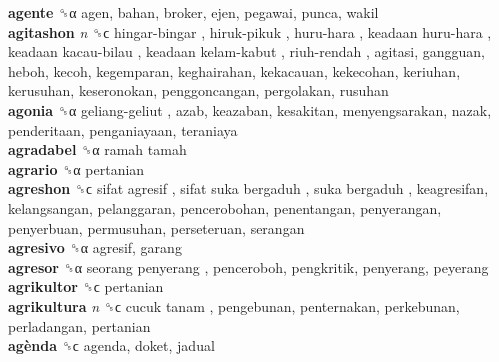 \textbf{agente} ␝α  agen, bahan, broker, ejen, pegawai, punca, wakil  \\
\textbf{agitashon} \emph{n}  ␝ϲ   hingar-bingar ,  hiruk-pikuk ,  huru-hara ,  keadaan huru-hara ,  keadaan kacau-bilau ,  keadaan kelam-kabut ,  riuh-rendah , agitasi, gangguan, heboh, kecoh, kegemparan, keghairahan, kekacauan, kekecohan, keriuhan, kerusuhan, keseronokan, penggoncangan, pergolakan, rusuhan  \\
\textbf{agonia} ␝α   geliang-geliut , azab, keazaban, kesakitan, menyengsarakan, nazak, penderitaan, penganiayaan, teraniaya  \\
\textbf{agradabel} ␝α   ramah tamah   \\
\textbf{agrario} ␝α  pertanian  \\
\textbf{agreshon} ␝ϲ   sifat agresif ,  sifat suka bergaduh ,  suka bergaduh , keagresifan, kelangsangan, pelanggaran, pencerobohan, penentangan, penyerangan, penyerbuan, permusuhan, perseteruan, serangan  \\
\textbf{agresivo} ␝α  agresif, garang  \\
\textbf{agresor} ␝α   seorang penyerang , penceroboh, pengkritik, penyerang, peyerang  \\
\textbf{agrikultor} ␝ϲ  pertanian  \\
\textbf{agrikultura} \emph{n}  ␝ϲ   cucuk tanam , pengebunan, penternakan, perkebunan, perladangan, pertanian  \\
\textbf{agènda} ␝ϲ  agenda, doket, jadual  \\
